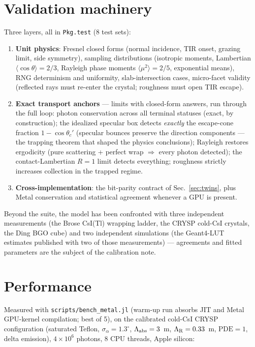 \documentclass[11pt,a4paper]{article}
\newcommand{\code}[1]{\texttt{#1}}
\begin{document}
\section{Validation machinery}
\label{sec:valid}

Three layers, all in \code{Pkg.test} (8 test sets):

\begin{enumerate}
  \item \textbf{Unit physics}: Fresnel closed forms (normal incidence, TIR onset,
    grazing limit, side symmetry), sampling distributions (isotropic moments,
    Lambertian $\langle\cos\theta\rangle = 2/3$, Rayleigh phase moments
    $\langle\mu^2\rangle = 2/5$, exponential means), RNG determinism and uniformity,
    slab-intersection cases, micro-facet validity (reflected rays must re-enter the
    crystal; roughness must open TIR escape).
  \item \textbf{Exact transport anchors} --- limits with closed-form answers, run
    through the full loop: photon conservation across all terminal statuses (exact, by
    construction); the idealized specular box detects \emph{exactly} the escape-cone
    fraction $1-\cos\theta_c'$ (specular bounces preserve the direction components ---
    the trapping theorem that shaped the physics conclusions); Rayleigh restores
    ergodicity (pure scattering + perfect wrap $\Rightarrow$ every photon detected);
    the contact-Lambertian $R=1$ limit detects everything; roughness strictly
    increases collection in the trapped regime.
  \item \textbf{Cross-implementation}: the bit-parity contract of
    Sec.~\ref{sec:twins}, plus Metal conservation and statistical agreement whenever
    a GPU is present.
\end{enumerate}

Beyond the suite, the model has been confronted with three independent measurements
(the Brose CsI(Tl) wrapping ladder, the CRYSP cold-CsI crystals, the Ding BGO cube) and two
independent simulations (the Geant4-LUT estimates published with two of those
measurements) --- agreements and fitted parameters are the subject of the calibration
note.

\section{Performance}
\label{sec:perf}

Measured with \code{scripts/bench\_metal.jl} (warm-up run absorbs JIT and Metal
GPU-kernel compilation; best of 5), on the calibrated cold-CsI CRYSP configuration
(saturated Teflon, $\sigma_\alpha = 1.3^\circ$, $\Lambda_{\rm abs} = 3$~m,
$\Lambda_{\rm R} = 0.33$~m, $\mathrm{PDE}=1$, delta emission), $4\times10^6$ photons,
8 CPU threads, Apple silicon:
\end{document}

